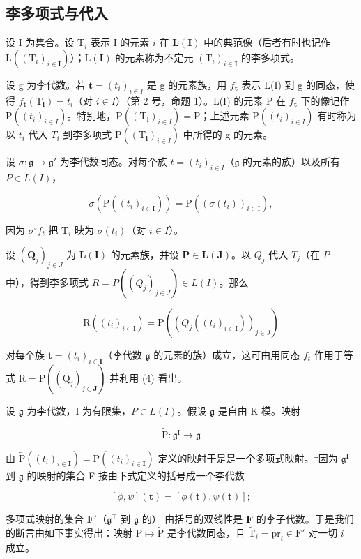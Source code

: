 \subsection{李多项式与代入}

设 I 为集合。设 \(\mathrm{T}_i\) 表示 I 的元素 \(i\) 在 \(\mathbf{L}(\mathbf{I})\) 中的典范像（后者有时也记作 \(\mathrm{L}((\mathrm{T}_i)_{i\in \mathbf{I}})\)）；\(\mathrm{L}(\mathbf{I})\) 的元素称为不定元 \((\mathrm{T}_i)_{i\in \mathbf{I}}\) 的李多项式。

设 g 为李代数。若 \(\boldsymbol{t} = (t_{i})_{i \in I}\) 是 g 的元素族，用 \(f_{\boldsymbol{t}}\) 表示 L(I) 到 g 的同态，使得 \(f_{\boldsymbol{t}}(\mathrm{T}_{\boldsymbol{i}}) = t_{i}\)（对 \(i \in I\)）（第 2 号，命题 1）。L(I) 的元素 P 在 \(f_{\boldsymbol{t}}\) 下的像记作 \(\mathrm{P}((t_{i})_{i \in I})\)。特别地，\(\mathrm{P}((\mathrm{T}_{\boldsymbol{i}})_{i \in I}) = \mathrm{P}\)；上述元素 \(\mathrm{P}((t_{i})_{i \in I})\) 有时称为以 \(t_{i}\) 代入 \(T_{i}\) 到李多项式 \(\mathrm{P}((\mathrm{T}_{\boldsymbol{i}})_{i \in I})\) 中所得的 g 的元素。

设 \(\sigma: \mathfrak{g} \to \mathfrak{g}'\) 为李代数同态。对每个族 \(t = (t_i)_{i \in I}\)（\(\mathfrak{g}\) 的元素的族）以及所有 \(P \in L(I)\)，

\[
\sigma (\mathrm{P} ((t _ {i}) _ {i \in \mathrm{I}})) = \mathrm{P} ((\sigma (t _ {i})) _ {i \in \mathrm{I}}),\tag{4}
\]

因为 \(\sigma^{\circ}f_{t}\) 把 \(\mathrm{T}_i\) 映为 \(\sigma(t_i)\)（对 \(i\in I\)）。

设 \((\mathbf{Q}_j)_{j\in J}\) 为 \(\mathbf{L}(\mathbf{I})\) 的元素族，并设 \(\mathbf{P}\in \mathbf{L}(\mathbf{J})\)。以 \(Q_{j}\) 代入 \(T_{j}\)（在 \(P\) 中），得到李多项式 \(R = P((Q_{j})_{j \in J}) \in L(I)\)。那么

\[
\mathrm{R} ((t _ {i}) _ {i \in \mathrm{I}}) = \mathrm{P} ((Q _ {j} ((t _ {i}) _ {i \in \mathrm{I}})) _ {j \in J})\tag{5}
\]

对每个族 \(\pmb{t} = (t_i)_{i\in \mathbf{I}}\)（李代数 \(\mathfrak{g}\) 的元素的族）成立，这可由用同态 \(f_{t}\) 作用于等式 \(\mathrm{R} = \mathrm{P}((\mathrm{Q}_j)_{j\in \mathbf{J}})\) 并利用 (4) 看出。

设 \(\mathfrak{g}\) 为李代数，I 为有限集，\(P \in L(I)\)。假设 \(\mathfrak{g}\) 是自由 K-模。映射

\[
\tilde {\mathrm{P}} \colon \mathfrak {g} ^ {\mathrm{I}} \to \mathfrak {g}
\]

由 \(\tilde{\mathrm{P}}((t_i)_{i\in \mathbf{I}}) = \mathrm{P}((t_i)_{i\in \mathbf{I}})\) 定义的映射于是是一个多项式映射。†因为 \(\mathfrak{g}^{\mathbf{I}}\) 到 \(\mathfrak{g}\) 的映射的集合 F 按由下式定义的括号成一个李代数

\[
[ \phi , \psi ] (\boldsymbol {t}) = [ \phi (\boldsymbol {t}), \psi (\boldsymbol {t}) ];\tag{6}
\]

多项式映射的集合 \(\mathbf{F}'\)（\(\mathfrak{g}^{\intercal}\) 到 \(\mathfrak{g}\) 的） 由括号的双线性是 \(\mathbf{F}\) 的李子代数。于是我们的断言由如下事实得出：映射 \(\mathrm{P} \mapsto \tilde{\mathrm{P}}\) 是李代数同态，且 \(\tilde{\mathrm{T}}_i = \mathrm{pr}_i \in \mathrm{F}'\) 对一切 \(i\) 成立。

